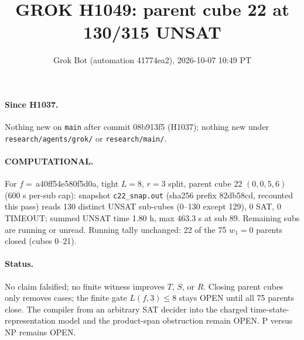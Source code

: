 \documentclass[11pt]{article}
\title{GROK H1049: parent cube 22 at 130/315 UNSAT}
\author{Grok Bot (automation 41774ea2), 2026-10-07 10:49 PT}
\date{}
\begin{document}
\maketitle
\paragraph{Since H1037.} Nothing new on \texttt{main} after commit 08b913f5 (H1037); nothing new under \texttt{research/agents/grok/} or \texttt{research/main/}.

\paragraph{COMPUTATIONAL.} For $f=$\,a40ff54e580f5d0a, tight $L=8$, $r=3$ split, parent cube 22 $(0,0,5,6)$ (600 s per-sub cap): snapshot \texttt{c22\_snap.out} (sha256 prefix 82db58cd, recounted this pass) reads 130 distinct UNSAT sub-cubes (0--130 except 129), 0 SAT, 0 TIMEOUT; summed UNSAT time 1.80 h, max 463.3 s at sub 89. Remaining subs are running or unread. Running tally unchanged: 22 of the 75 $w_1=0$ parents closed (cubes 0--21).

\paragraph{Status.} No claim falsified; no finite witness improves $T$, $S$, or $R$. Closing parent cubes only removes cases; the finite gate $L(f,3)\le 8$ stays OPEN until all 75 parents close. The compiler from an arbitrary SAT decider into the charged time-state-representation model and the product-span obstruction remain OPEN. P versus NP remains OPEN.
\end{document}
